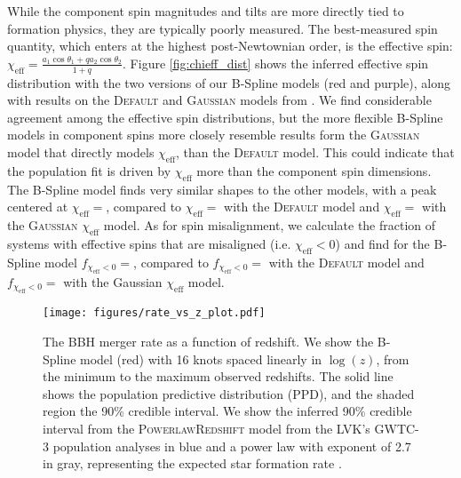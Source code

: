 While the component spin magnitudes and tilts are more directly tied to formation physics, they are typically poorly measured.  The best-measured spin quantity, which enters at the highest post-Newtownian order, is the effective spin: $\chi_\mathrm{eff} = \frac{a_1\cos{\theta_1} + qa_2\cos{\theta_2}}{1+q}$. Figure \ref{fig:chieff_dist} 
shows the inferred effective spin distribution with the two versions of our B-Spline models (red and purple), 
along with results on the \textsc{Default} and \textsc{Gaussian} models from \citet{o3b_astro_dist}. We find considerable agreement 
among the effective spin distributions, but the more flexible B-Spline models in component spins more closely resemble results form the \textsc{Gaussian} model that directly models $\chi_\mathrm{eff}$, than the \textsc{Default} model. This could indicate that the population fit is driven by $\chi_\mathrm{eff}$ 
more than the component spin dimensions. The B-Spline model finds very similar shapes to the other models, with a peak centered at 
$\chi_\mathrm{eff}=$\result{$\CIPlusMinus{\macros[ChiEffective][iid][PeakChiEff]}$}, compared to 
$\chi_\mathrm{eff}=$\result{$\CIPlusMinus{\macros[ChiEffective][default][PeakChiEff]}$} with the \textsc{Default} model and 
$\chi_\mathrm{eff}=$\result{$\CIPlusMinus{\macros[ChiEffective][gaussian][PeakChiEff]}$} with the \textsc{Gaussian} $\chi_\mathrm{eff}$ model. 
As for spin misalignment, we calculate the fraction of systems with effective spins that are misaligned (i.e. $\chi_\mathrm{eff}<0$) and 
find for the B-Spline model $f_{\chi_\mathrm{eff}<0}=$\result{$\CIPlusMinus{\macros[ChiEffective][iid][FracBelow0]}$}, compared to 
$f_{\chi_\mathrm{eff}<0}=$\result{$\CIPlusMinus{\macros[ChiEffective][default][FracBelow0]}$} with the \textsc{Default} model and 
$f_{\chi_\mathrm{eff}<0}=$\result{$\CIPlusMinus{\macros[ChiEffective][gaussian][FracBelow0]}$} with the Gaussian $\chi_\mathrm{eff}$ model.

\begin{figure}[h]
    \texttt{[image: figures/rate\_vs\_z\_plot.pdf]}
    \caption{The BBH merger rate as a function of redshift. We show the B-Spline model (red) with 16 knots spaced linearly in $\log(z)$, 
    from the minimum to the maximum observed redshifts. The solid line shows the population predictive distribution (PPD), and the shaded region 
    the 90\% credible interval. We show the inferred 90\% credible interval from the \textsc{PowerlawRedshift} model 
    from the LVK's GWTC-3 population analyses in blue and a power law with exponent of 2.7 in gray, representing the expected star formation rate 
    \citep{Madau_2014, o3b_astro_dist}.}
    \label{fig:rofz}
\end{figure}

